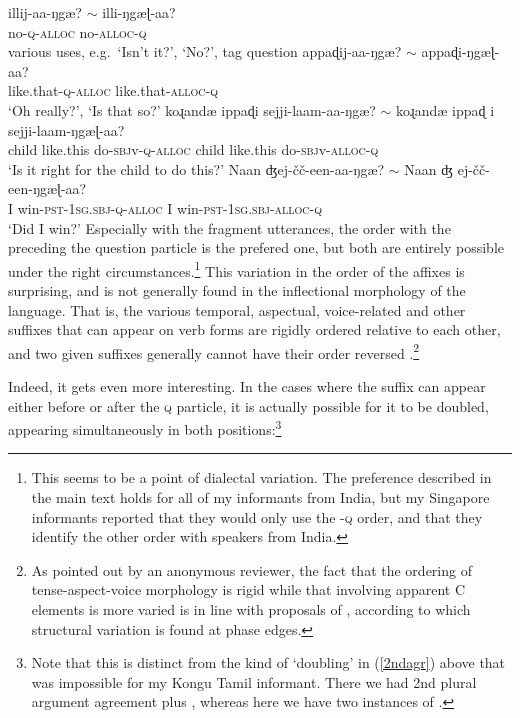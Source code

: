 \documentclass[output=paper, modfonts, nonflat]{langsci/langscibook}
\begin{document}
\ea
 \ea\label{illiya}\gll illij-aa-ŋgæ? $\sim$ illi-ŋgæɭ-aa?\\
 no-\textsc{q}-\textsc{alloc}{} {} no-\textsc{alloc}-\textsc{q}\\
 \glt various uses, e.g.\ `Isn't it?', `No?', tag question
 \ex\label{apdiya}\gll appaɖij-aa-ŋgæ? $\sim$ appaɖi-ŋgæɭ-aa?\\
 like.that-\textsc{q}-\textsc{alloc}{} {} like.that-\textsc{alloc}-\textsc{q}\\
 \glt `Oh really?', `Is that so?' 
 \ex\label{child}\gll koɻandæ{} ippaɖi sejji-laam-aa-ŋgæ? $\sim$
 koɻandæ{} ippaɖ
 i sejji-laam-ŋgæɭ-aa?\\ 
 child like.this do-\textsc{sbj}v-\textsc{q}-\textsc{alloc}{} {} child like.this
 do-\textsc{sbj}v-\textsc{alloc}-\textsc{q}\\ 
 \glt `Is it right for the child to do this?'
 \ex\label{winning}\gll Naan ʤej-\v{c}\v{c}-een-aa-ŋgæ? $\sim$ Naan ʤ
 ej-\v{c}\v{c}-een-ŋgæɭ-aa?\\
 I win-\textsc{pst}-1\textsc{sg}.\textsc{sbj}-\textsc{q}-\textsc{alloc}{} {} I win-\textsc{pst}-1\textsc{sg}.\textsc{sbj}-\textsc{alloc}-\textsc{q}\\
 \glt `Did I win?'
 \z
\z
%
Especially with the fragment utterances, the order with the \allagr{}
preceding the question particle is the prefered one, but both are
entirely possible under the right circumstances.\footnote{This seems
  to be a point of dialectal variation. The preference described in
  the main text holds for all of my informants from India, but my
  Singapore informants reported that they would only use the
  \allagr-\textsc{q} order, and that they identify the other order
  with speakers from India.} This variation in the order of the
affixes is surprising, and is not generally found in the inflectional
morphology of the language. That is, the various temporal, aspectual,
voice-related and other suffixes that can appear on verb forms are
rigidly ordered relative to each other, and two given suffixes
generally cannot have their order reversed \citep[for extended
discussion on this point,
see][]{sundaresanmcfadden:tamtrans}.\footnote{As pointed out by an
  anonymous reviewer, the fact that the ordering of tense-aspect-voice
  morphology is rigid while that involving apparent C elements is more
  varied is in line with proposals of \citet{aboh:2015}, according to
  which structural variation is found at phase edges.}

Indeed, it gets even more interesting. In the cases where the
\allagr{} suffix can appear either before or after the \textsc{q}
particle, it is actually possible for it to be doubled, appearing
simultaneously in both positions:\footnote{Note that this is distinct
  from the kind of `doubling' in (\ref{2ndagr}) above that was
  impossible for my Kongu Tamil informant. There we had 2nd plural
  argument agreement plus \allagr, whereas here we have two instances
  of \allagr.}
\end{document}
